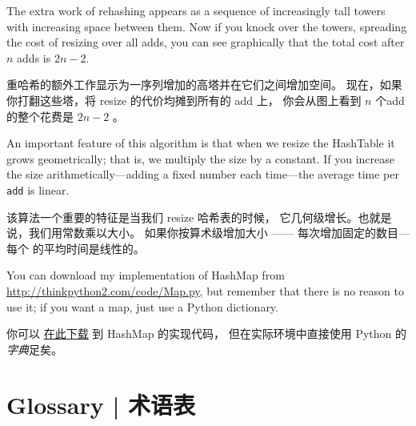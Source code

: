 The extra work of rehashing appears as a sequence of increasingly
tall towers with increasing space between them.  Now if you knock
over the towers, spreading the cost of resizing over all
adds, you can see graphically that the total cost after $n$
adds is $2n - 2$.

重哈希的额外工作显示为一序列增加的高塔并在它们之间增加空间。
现在，如果你打翻这些塔，将 resize 的代价均摊到所有的 add 上，
你会从图上看到 $n$ 个add的整个花费是 $2n - 2$ 。

An important feature of this algorithm is that when we resize the
HashTable it grows geometrically; that is, we multiply the size by a
constant.  If you increase the size
arithmetically---adding a fixed number each time---the average time
per {\tt add} is linear.

该算法一个重要的特征是当我们 resize 哈希表的时候，
它几何级增长。也就是说，我们用常数乘以大小。
如果你按算术级增加大小 —— 每次增加固定的数目—每个  的平均时间是线性的。

You can download my implementation of HashMap from
\url{http://thinkpython2.com/code/Map.py}, but remember that there
is no reason to use it; if you want a map, just use a Python dictionary.

你可以 \href{http://thinkpython2.com/code/Map.py}{在此下载} 到 HashMap 的实现代码， 但在实际环境中直接使用 Python 的{\em 字典}足矣。

\section{Glossary  |  术语表}

